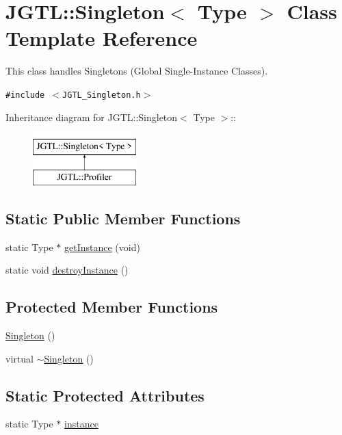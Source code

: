 \hypertarget{class_j_g_t_l_1_1_singleton}{
\section{JGTL::Singleton$<$ Type $>$ Class Template Reference}
\label{class_j_g_t_l_1_1_singleton}
}
This class handles Singletons (Global Single-Instance Classes).  


{\tt \#include $<$JGTL\_\-Singleton.h$>$}

Inheritance diagram for JGTL::Singleton$<$ Type $>$::\begin{figure}[H]
\begin{center}
\leavevmode
\includegraphics[height=2cm]{class_j_g_t_l_1_1_singleton}
\end{center}
\end{figure}
\subsection*{Static Public Member Functions}
\begin{CompactItemize}
\item 
static Type $\ast$ \hyperlink{class_j_g_t_l_1_1_singleton_ce18cf22abba60cac12ae26914ef3853}{get\-Instance} (void)
\item 
static void \hyperlink{class_j_g_t_l_1_1_singleton_59788c79ef7102b584b475aafc9e2315}{destroy\-Instance} ()
\end{CompactItemize}
\subsection*{Protected Member Functions}
\begin{CompactItemize}
\item 
\hyperlink{class_j_g_t_l_1_1_singleton_c7877acab4b56ed562f642e040247c7a}{Singleton} ()
\item 
virtual \hyperlink{class_j_g_t_l_1_1_singleton_44f0141a9d7e4931361ea08186c65300}{$\sim$Singleton} ()
\end{CompactItemize}
\subsection*{Static Protected Attributes}
\begin{CompactItemize}
\item 
static Type $\ast$ \hyperlink{class_j_g_t_l_1_1_singleton_a3be92cc77155d83555fbecc5469135b}{instance}
\end{CompactItemize}


